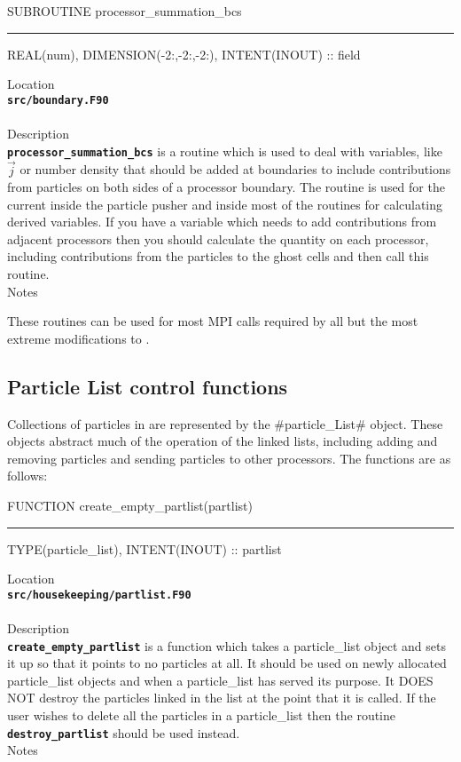 \documentclass[12pt,a4paper]{article}
\newcommand{\HRule}{\rule[0.3cm]{\linewidth}{0.5mm}}
\newcommand{\inlinecode}[1]{{\color{warwickred} \bf\texttt{#1}}}
\newcommand{\EPOCH}{{\color{warwickdark}\fontfamily{phv}\selectfont{EPOCH}}}
\begin{document}
\pagebreak
\begin{codedef}
SUBROUTINE processor_summation_bcs
\HRule
REAL(num), DIMENSION(-2:,-2:,-2:), INTENT(INOUT) :: field
\end{codedef}
\vspace{1cm}
{\Large Location\\}
\inlinecode{src/boundary.F90}\\
\\[0.5cm]
{\Large Description\\}
\inlinecode{processor\_summation\_bcs} is a routine which is used to deal with
variables, like $\vec{j}$ or number density that should be added at boundaries
to include contributions from particles on both sides of a processor boundary.
The routine is used for the current inside the particle pusher and inside most
of the routines for calculating derived variables. If you have a variable
which needs to add contributions from adjacent processors then you should
calculate the quantity on each processor, including contributions from the
particles to the ghost cells and then call this routine.
\\[0.5cm]
{\Large Notes\\}
\pagebreak

These routines can be used for most MPI calls required by all but the most
extreme modifications to {\EPOCH}.

\subsection{Particle List control functions}
Collections of particles in {\EPOCH} are represented by the #particle_List#
object. These objects abstract much of the operation of the linked lists,
including adding and removing particles and sending particles to other
processors. The functions are as follows:

\pagebreak
\begin{codedef}
FUNCTION create_empty_partlist(partlist)
\HRule
TYPE(particle_list), INTENT(INOUT) :: partlist
\end{codedef}
\vspace{1cm}
{\Large Location\\}
\inlinecode{src/housekeeping/partlist.F90}\\
\\[0.5cm]
{\Large Description\\}
\inlinecode{create\_empty\_partlist} is a function which takes a particle\_list
object and sets it up so that it points to no particles at all. It should be
used on newly allocated particle\_list objects and when a particle\_list has
served its purpose. It DOES NOT destroy the particles linked in the list at
the point that it is called. If the user wishes to delete all the particles in a
particle\_list then the routine \inlinecode{destroy\_partlist} should be used
instead.
\\[0.5cm]
{\Large Notes\\}
\end{document}
